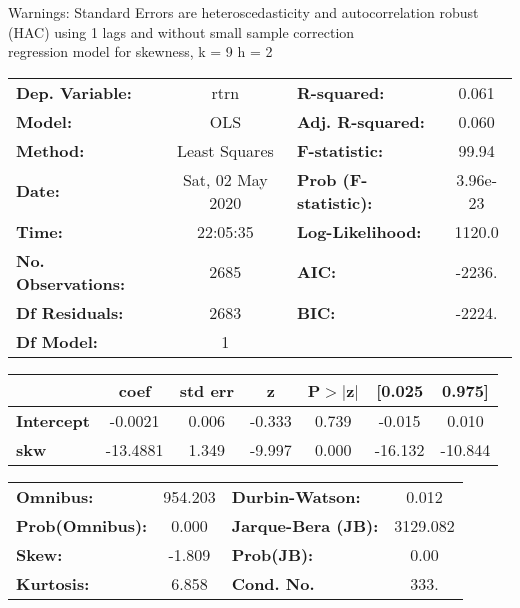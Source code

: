 Warnings: \newline
 [1] Standard Errors are heteroscedasticity and autocorrelation robust (HAC) using 1 lags and without small sample correction\\ 

regression model for skewness, k = 9 h = 2\begin{center}
\begin{tabular}{lclc}
\toprule
\textbf{Dep. Variable:}    &       rtrn       & \textbf{  R-squared:         } &     0.061   \\
\textbf{Model:}            &       OLS        & \textbf{  Adj. R-squared:    } &     0.060   \\
\textbf{Method:}           &  Least Squares   & \textbf{  F-statistic:       } &     99.94   \\
\textbf{Date:}             & Sat, 02 May 2020 & \textbf{  Prob (F-statistic):} &  3.96e-23   \\
\textbf{Time:}             &     22:05:35     & \textbf{  Log-Likelihood:    } &    1120.0   \\
\textbf{No. Observations:} &        2685      & \textbf{  AIC:               } &    -2236.   \\
\textbf{Df Residuals:}     &        2683      & \textbf{  BIC:               } &    -2224.   \\
\textbf{Df Model:}         &           1      & \textbf{                     } &             \\
\bottomrule
\end{tabular}
\begin{tabular}{lcccccc}
                   & \textbf{coef} & \textbf{std err} & \textbf{z} & \textbf{P$> |$z$|$} & \textbf{[0.025} & \textbf{0.975]}  \\
\midrule
\textbf{Intercept} &      -0.0021  &        0.006     &    -0.333  &         0.739        &       -0.015    &        0.010     \\
\textbf{skw}       &     -13.4881  &        1.349     &    -9.997  &         0.000        &      -16.132    &      -10.844     \\
\bottomrule
\end{tabular}
\begin{tabular}{lclc}
\textbf{Omnibus:}       & 954.203 & \textbf{  Durbin-Watson:     } &    0.012  \\
\textbf{Prob(Omnibus):} &   0.000 & \textbf{  Jarque-Bera (JB):  } & 3129.082  \\
\textbf{Skew:}          &  -1.809 & \textbf{  Prob(JB):          } &     0.00  \\
\textbf{Kurtosis:}      &   6.858 & \textbf{  Cond. No.          } &     333.  \\
\bottomrule
\end{tabular}
\end{center}


